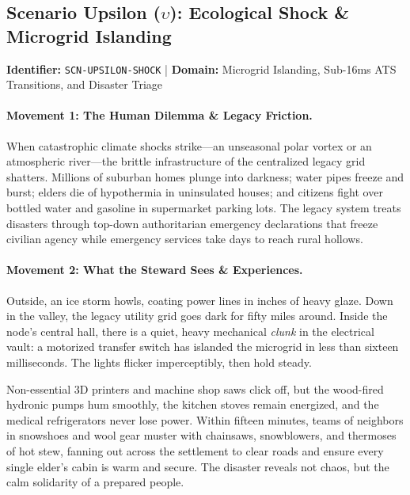\subsection{Scenario Upsilon (\texorpdfstring{$\upsilon$}{Upsilon}): Ecological Shock \& Microgrid Islanding}
\label{subsec:scn_upsilon}
\textbf{Identifier:} \texttt{SCN-UPSILON-SHOCK} \quad | \quad \textbf{Domain:} Microgrid Islanding, Sub-16ms ATS Transitions, and Disaster Triage

\paragraph{Movement 1: The Human Dilemma \& Legacy Friction.}
When catastrophic climate shocks strike---an unseasonal polar vortex or an atmospheric river---the brittle infrastructure of the centralized legacy grid shatters. Millions of suburban homes plunge into darkness; water pipes freeze and burst; elders die of hypothermia in uninsulated houses; and citizens fight over bottled water and gasoline in supermarket parking lots. The legacy system treats disasters through top-down authoritarian emergency declarations that freeze civilian agency while emergency services take days to reach rural hollows.

\paragraph{Movement 2: What the Steward Sees \& Experiences.}
Outside, an ice storm howls, coating power lines in inches of heavy glaze. Down in the valley, the legacy utility grid goes dark for fifty miles around. Inside the node's central hall, there is a quiet, heavy mechanical \textit{clunk} in the electrical vault: a motorized transfer switch has islanded the microgrid in less than sixteen milliseconds. The lights flicker imperceptibly, then hold steady. 

Non-essential 3D printers and machine shop saws click off, but the wood-fired hydronic pumps hum smoothly, the kitchen stoves remain energized, and the medical refrigerators never lose power. Within fifteen minutes, teams of neighbors in snowshoes and wool gear muster with chainsaws, snowblowers, and thermoses of hot stew, fanning out across the settlement to clear roads and ensure every single elder's cabin is warm and secure. The disaster reveals not chaos, but the calm solidarity of a prepared people.

